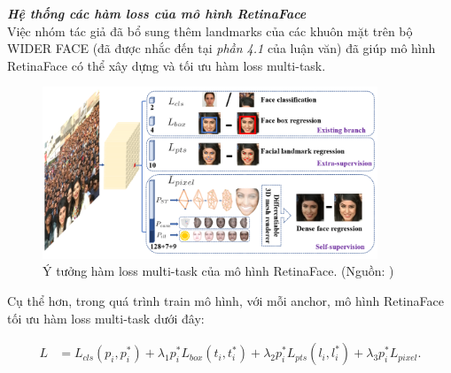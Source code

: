 {    \noindent
    \textbf{\textit{Hệ thống các hàm loss của mô hình RetinaFace}} \\
    Việc nhóm tác giả đã bổ sung thêm landmarks của các khuôn mặt trên bộ WIDER FACE (đã được nhắc đến tại \textit{phần 4.1} của luận văn) đã giúp mô hình RetinaFace có thể xây dựng và tối ưu hàm loss multi-task.

    \begin{figure}[H]
        \centering
        \includegraphics[width=10cm] {images/retinaface_loss_funcs}
        \caption{Ý tưởng hàm loss multi-task của mô hình RetinaFace. (Nguồn: \cite{deng2020retinaface})}
        \label{fig:retinaface_loss_funcs}
    \end{figure}

    Cụ thể hơn, trong quá trình train mô hình, với mỗi anchor, mô hình RetinaFace tối ưu hàm loss multi-task dưới đây:

    \begin{equation}
        \begin{split}
        L  & =  L_{cls}(p_i, p^{*}_i) + \lambda_1 p^{*}_i L_{box}(t_i, t^{*}_i) + \lambda_2 p^{*}_i L_{pts} (l_i, l^{*}_i) + \lambda_3 p^{*}_i L_{pixel}.\\
        \end{split}
        \label{eq:retinaface_loss}
    \end{equation}

}
